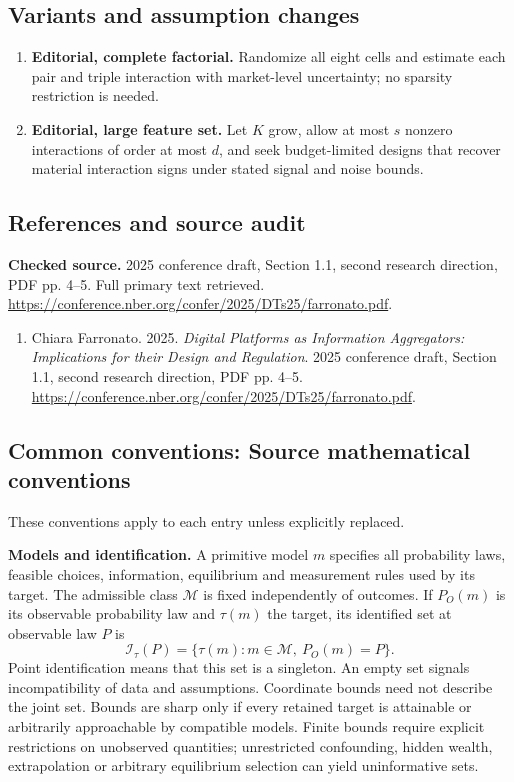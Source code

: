 \documentclass[11pt,a4paper]{article}
\begin{document}
\subsection*{Variants and assumption changes}
\begin{enumerate}
\item \textbf{Editorial, complete factorial.} Randomize all eight cells and estimate each pair and triple interaction with market-level uncertainty; no sparsity restriction is needed.
\item \textbf{Editorial, large feature set.} Let \(K\) grow, allow at most \(s\) nonzero interactions of order at most \(d\), and seek budget-limited designs that recover material interaction signs under stated signal and noise bounds.
\end{enumerate}
\subsection*{References and source audit}
\textbf{Checked source.} 2025 conference draft, Section 1.1, second research direction, PDF pp. 4--5. Full primary text retrieved. \url{https://conference.nber.org/confer/2025/DTs25/farronato.pdf}.
\begin{enumerate}\raggedright
\item\hypertarget{definitions:source:30007683:1}{} Chiara Farronato. 2025. \emph{Digital Platforms as Information Aggregators: Implications for their Design and Regulation}. 2025 conference draft, Section 1.1, second research direction, PDF pp. 4--5.
\url{https://conference.nber.org/confer/2025/DTs25/farronato.pdf}.
\end{enumerate}

\subsection*{Common conventions: Source mathematical conventions}

These conventions apply to each entry unless explicitly replaced.

\textbf{Models and identification.} A primitive model \(m\) specifies all probability laws, feasible choices, information, equilibrium and measurement rules used by its target. The admissible class \(\mathcal M\) is fixed independently of outcomes. If \(P_O(m)\) is its observable probability law and \(\tau(m)\) the target, its identified set at observable law \(P\) is
\[
 \mathcal I_\tau(P)=\{\tau(m):m\in\mathcal M,\ P_O(m)=P\}.
\]
Point identification means that this set is a singleton. An empty set signals incompatibility of data and assumptions. Coordinate bounds need not describe the joint set. Bounds are sharp only if every retained target is attainable or arbitrarily approachable by compatible models. Finite bounds require explicit restrictions on unobserved quantities; unrestricted confounding, hidden wealth, extrapolation or arbitrary equilibrium selection can yield uninformative sets.
\end{document}
